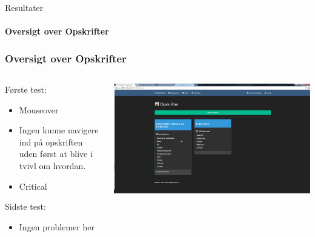\begin{frame}{Resultater}
\framesubtitle{Oversigt over Opskrifter}
	\subsubsection{Oversigt over Opskrifter}
	
	\begin{minipage}[0.3\textheight]{\textwidth}
	\begin{columns}[T]
	\begin{column}{0.5\textwidth}
	
	Første test:
	\begin{itemize}
	\item Mouseover
	\item Ingen kunne navigere ind på opskriften uden først at blive i tvivl om hvordan.
	\item Critical
	
	\end{itemize}
	Sidste test:
	\begin{itemize}
		\item Ingen problemer her
	\end{itemize}
	
	\end{column}
	\begin{column}{0.5\textwidth}
	 \includegraphics[width=1\textwidth,height=1\textheight,keepaspectratio, trim={1cm 0 0 16mm}, clip]{images/Screenshots/RecipeOld.png}
	 
	 \vspace{2 mm}
	  

\end{column}
\end{columns}
\end{minipage}
\end{frame}
